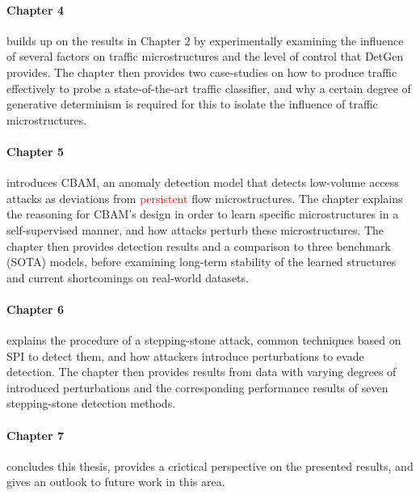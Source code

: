 \paragraph*{Chapter 4} builds up on the results in Chapter 2 by experimentally examining the influence of several factors on traffic microstructures and the level of control that DetGen provides. The chapter then provides two case-studies on how to produce traffic effectively to probe a state-of-the-art traffic classifier, and why a certain degree of generative determinism is required for this to isolate the influence of traffic microstructures. 

\paragraph*{Chapter 5} introduces CBAM, an anomaly detection model that detects low-volume access attacks as deviations from \textcolor{red}{persistent} flow microstructures. The chapter explains the reasoning for CBAM's design in order to learn specific microstructures in a self-supervised manner, and how attacks perturb these microstructures. The chapter then provides detection results and a comparison to three benchmark (SOTA) models, before examining long-term stability of the learned structures and current shortcomings on real-world datasets.

\paragraph*{Chapter 6} explains the procedure of a stepping-stone attack, common techniques based on SPI to detect them, and how attackers introduce perturbations to evade detection. The chapter then provides  results from data with varying degrees of introduced perturbations and the corresponding performance results of seven stepping-stone detection methods.

\paragraph*{Chapter 7} concludes this thesis, provides a crictical perspective on the presented results, and gives an outlook to future work in this area.
